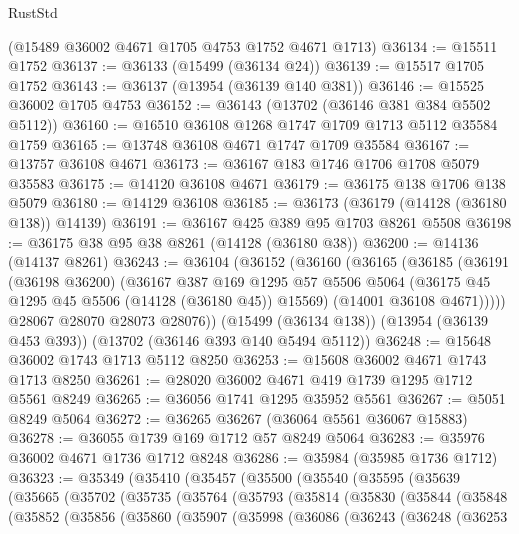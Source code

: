 \begin{lexlean}{RustStd}
\begin{coremodule}
    (@15489 @36002 @4671 @1705 @4753 @1752 @4671 @1713)
@36134 := @15511 @1752
@36137 := @36133 (@15499 (@36134 @24))
@36139 := @15517 @1705 @1752
@36143 := @36137 (@13954 (@36139 @140 @381))
@36146 := @15525 @36002 @1705 @4753
@36152 := @36143 (@13702 (@36146 @381 @384 @5502 @5112))
@36160 := @16510 @36108 @1268 @1747 @1709 @1713 @5112 @35584 @1759
@36165 := @13748 @36108 @4671 @1747 @1709 @35584
@36167 := @13757 @36108 @4671
@36173 := @36167 @183 @1746 @1706 @1708 @5079 @35583
@36175 := @14120 @36108 @4671
@36179 := @36175 @138 @1706 @138 @5079
@36180 := @14129 @36108
@36185 := @36173 (@36179 (@14128 (@36180 @138)) @14139)
@36191 := @36167 @425 @389 @95 @1703 @8261 @5508
@36198 := @36175 @38 @95 @38 @8261 (@14128 (@36180 @38))
@36200 := @14136 (@14137 @8261)
@36243 := @36104
    (@36152
      (@36160
        (@36165
          (@36185
            (@36191
              (@36198 @36200)
              (@36167
                @387
                @169
                @1295
                @57
                @5506
                @5064
                (@36175 @45 @1295 @45 @5506 (@14128 (@36180 @45)) @15569)
                (@14001 @36108 @4671)))))
        @28067
        @28070
        @28073
        @28076))
    (@15499 (@36134 @138))
    (@13954 (@36139 @453 @393))
    (@13702 (@36146 @393 @140 @5494 @5112))
@36248 := @15648 @36002 @1743 @1713 @5112 @8250
@36253 := @15608 @36002 @4671 @1743 @1713 @8250
@36261 := @28020 @36002 @4671 @419 @1739 @1295 @1712 @5561 @8249
@36265 := @36056 @1741 @1295 @35952 @5561
@36267 := @5051 @8249 @5064
@36272 := @36265 @36267 (@36064 @5561 @36067 @15883)
@36278 := @36055 @1739 @169 @1712 @57 @8249 @5064
@36283 := @35976 @36002 @4671 @1736 @1712 @8248
@36286 := @35984 (@35985 @1736 @1712)
@36323 := @35349
    (@35410
      (@35457
        (@35500
          (@35540
            (@35595
              (@35639
                (@35665
                  (@35702
                    (@35735
                      (@35764
                        (@35793
                          (@35814
                            (@35830
                              (@35844
                                (@35848
                                  (@35852
                                    (@35856
                                      (@35860
                                        (@35907
                                          (@35998
                                            (@36086
                                              (@36243
                                                (@36248
                                                  (@36253

\end{coremodule}
\end{lexlean}
